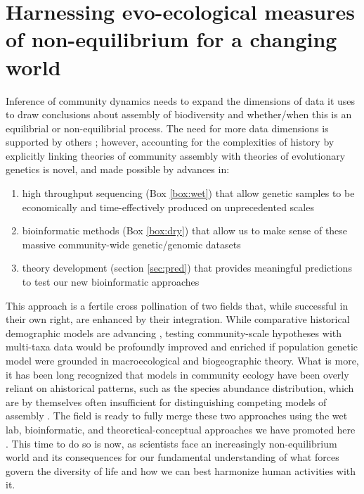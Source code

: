 \documentclass[12pt]{article}
\newcounter{Box}
\begin{document}
\section{Harnessing evo-ecological measures of non-equilibrium for a changing world}

Inference of community dynamics needs to expand the dimensions of data
it uses to draw conclusions about assembly of biodiversity and
whether/when this is an equilibrial or non-equilibrial process. The
need for more data dimensions is supported by others
\citep{McGill2007-hx}; however, accounting for the complexities of
history by explicitly linking theories of community assembly with
theories of evolutionary genetics is novel, and made possible by
advances in:
\begin{enumerate}
\item high throughput sequencing (Box \ref{box:wet}) that allow
  genetic samples to be economically and time-effectively produced on
  unprecedented scales
\item bioinformatic methods (Box \ref{box:dry}) that allow
  us to make sense of these massive community-wide genetic/genomic
  datasets
\item theory development (section \ref{sec:pred}) that provides
  meaningful predictions to test our new bioinformatic approaches
\end{enumerate}

This approach is a fertile cross pollination of two fields that, while
successful in their own right, are enhanced by their
integration. While comparative historical demographic models are
advancing \citep{Xue2015-el, Hickerson2006-uf, Carstens2016-mc,
  Chan2014-nq, Satler2016-lb}, testing community-scale hypotheses with
multi-taxa data would be profoundly improved and enriched if
population genetic model were grounded in macroecological and
biogeographic theory.  What is more, it has been long recognized that
models in community ecology have been overly reliant on ahistorical
patterns, such as the species abundance distribution, which are by
themselves often insufficient for distinguishing competing models of
assembly \citep{McGill2007-hx}.  The field is ready to
fully merge these two approaches using the wet lab, bioinformatic, and
theoretical-conceptual approaches we have promoted here . This time to do so is now, 
% 
% 
% 
 as scientists face an increasingly
non-equilibrium world and its consequences for our fundamental
understanding of what forces govern the diversity of life and how we
can best harmonize human activities with it.
\end{document}
